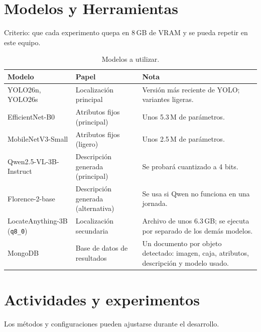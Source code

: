 \documentclass[11pt,a4paper]{article}
\begin{document}
\section{Modelos y Herramientas}

Criterio: que cada experimento quepa en 8\,GB de VRAM y se pueda repetir en este equipo.

\begin{table}[h]
\centering
\small
\begin{tabularx}{\textwidth}{@{}lYY@{}}
\toprule
Modelo & Papel & Nota \\
\midrule
YOLO26n, YOLO26s & Localizaci\'on principal & Versi\'on m\'as reciente de YOLO; variantes ligeras. \\
EfficientNet-B0 & Atributos fijos (principal) & Unos 5.3\,M de par\'ametros. \\
MobileNetV3-Small & Atributos fijos (ligero) & Unos 2.5\,M de par\'ametros. \\
Qwen2.5-VL-3B-Instruct & Descripci\'on generada (principal) & Se probar\'a cuantizado a 4 bits. \\
Florence-2-base & Descripci\'on generada (alternativa) & Se usa si Qwen no funciona en una jornada. \\
LocateAnything-3B (\texttt{q8\_0}) & Localizaci\'on secundaria & Archivo de unos 6.3\,GB; se ejecuta por separado de los dem\'as modelos. \\
MongoDB  & Base de datos de resultados & Un documento por objeto detectado: imagen, caja, atributos, descripci\'on y modelo usado. \\
\bottomrule
\end{tabularx}
\caption{Modelos a utilizar.}
\end{table}


\section{Actividades y experimentos}

Los m\'etodos y configuraciones pueden ajustarse durante el desarrollo.
\end{document}
